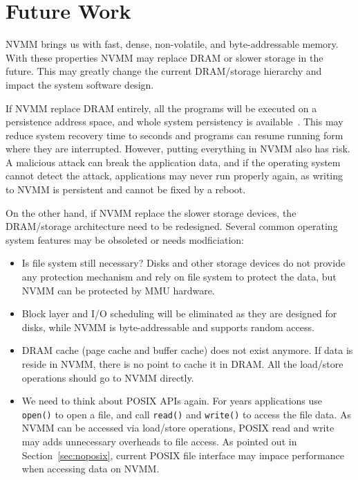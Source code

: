 \section{Future Work} 
\label{sec:future}

NVMM brings us with fast, dense,
non-volatile, and byte-addressable memory. With these properties NVMM may
replace DRAM or slower storage in the future.
This may greatly change the current DRAM/storage
hierarchy and impact the system software design.

If NVMM replace DRAM entirely, all the programs will be executed on a
persistence address space, and whole system persistency is available~\cite{WSP}.
This may reduce system recovery time to seconds and programs can resume
running form where they are interrupted. However, putting everything in
NVMM also has risk. A malicious attack can break the application data, and if
the operating system cannot detect the attack, applications may never run
properly again, as writing to NVMM is persistent and cannot be fixed by a reboot. 

On the other hand, if NVMM replace the slower storage devices, the DRAM/storage
architecture need to be redesigned. Several common operating system features
may be obsoleted or needs modficiation:
\begin{itemize}
\item Is file system still necessary?
Disks and other storage devices do not provide any
protection mechanism and rely on file system to protect the data, but NVMM
can be protected by MMU hardware.
\item Block layer and I/O scheduling
will be eliminated as they are designed for disks,
while NVMM is byte-addressable and supports random access.
\item DRAM cache (page cache and buffer cache) does not exist anymore. If data
is reside in NVMM, there is no point to cache it in DRAM. All the load/store
operations should go to NVMM directly.
\item We need to think about POSIX APIs again. For years applications use
\texttt{open()} to open a file, and call \texttt{read()} and \texttt{write()} to
access the file data. As NVMM can be accessed via load/store operations, 
POSIX read and write may adds unnecessary overheads to file access.
 As pointed out in Section~\ref{sec:noposix}, current POSIX file 
interface may impace performance when accessing data on NVMM.
\end{itemize}


